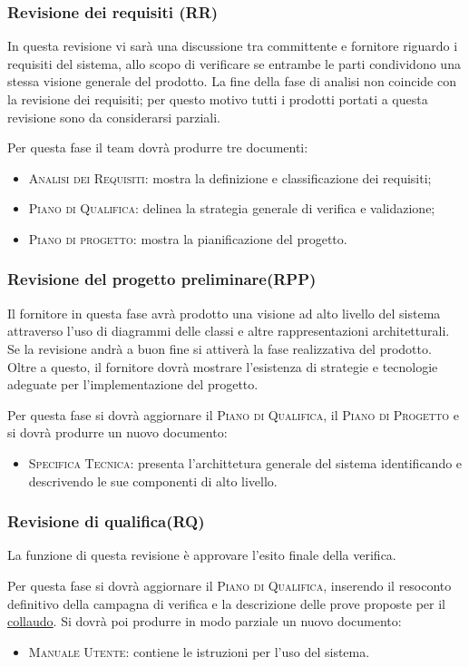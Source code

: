 \documentclass[11pt,a4paper]{article}
\begin{document}
\subsubsection{Revisione dei requisiti (RR)}
In questa revisione vi sarà una discussione tra committente e fornitore riguardo i requisiti del sistema, allo scopo di verificare se entrambe le parti condividono una stessa visione generale del prodotto.
La fine della fase di analisi non coincide con la revisione dei requisiti; per questo motivo tutti i prodotti portati a questa revisione sono da considerarsi parziali.

Per questa fase il team dovrà produrre tre documenti:
\begin{itemize}
\item \textsc{Analisi dei Requisiti}: mostra la definizione e classificazione dei requisiti;
\item \textsc{Piano di Qualifica}: delinea la strategia generale di verifica e validazione;
\item \textsc{Piano di progetto}: mostra la pianificazione del progetto.
\end{itemize}
\subsubsection{Revisione del progetto preliminare(RPP)}
Il fornitore in questa fase avrà prodotto una visione ad alto livello del sistema attraverso l'uso di diagrammi delle classi e altre rappresentazioni architetturali.
Se la revisione andrà a buon fine si attiverà la fase realizzativa del prodotto.
Oltre a questo, il fornitore dovrà mostrare l'esistenza di strategie e tecnologie adeguate per l'implementazione del progetto.

Per questa fase si dovrà aggiornare il \textsc{Piano di Qualifica}, il \textsc{Piano di Progetto} e si dovrà produrre un nuovo documento:
\begin{itemize}
\item \textsc{Specifica Tecnica}: presenta l'archittetura generale del sistema identificando e descrivendo le sue componenti di alto livello.
\end{itemize}
\subsubsection{Revisione di qualifica(RQ)}
La funzione di questa revisione è approvare l'esito finale della verifica.

Per questa fase si dovrà aggiornare il \textsc{Piano di Qualifica}, inserendo il resoconto definitivo della campagna di verifica e la descrizione delle prove proposte per il \underline{collaudo}. Si dovrà poi produrre in modo parziale un nuovo documento:
\begin{itemize}
\item \textsc{Manuale Utente}: contiene le istruzioni per l'uso del sistema.
\end{itemize}
\end{document}
